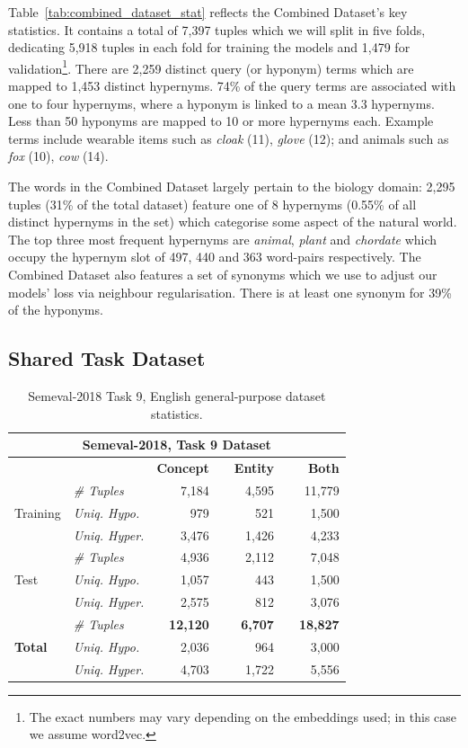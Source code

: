 Table~\ref{tab:combined_dataset_stat} reflects the Combined Dataset's key statistics.  It contains a total of 7,397 tuples which we will split in five folds, dedicating 5,918 tuples in each fold for training the models and 1,479 for validation\footnote{The exact numbers may vary depending on the embeddings used; in this case we assume word2vec.}.  There are 2,259 distinct query (or hyponym) terms which are mapped to 1,453 distinct hypernyms.  74\% of the query terms are associated with one to four hypernyms, where a hyponym is linked to a mean 3.3 hypernyms.  Less than 50 hyponyms are mapped to 10 or more hypernyms each.  Example terms include wearable items such as \textit{cloak} (11), \textit{glove} (12); and animals such as \textit{fox} (10), \textit{cow} (14).  

The words in the Combined Dataset largely pertain to the biology domain: 2,295 tuples (31\% of the total dataset) feature one of 8 hypernyms (0.55\% of all distinct hypernyms in the set) which categorise some aspect of the natural world.  The top three most frequent hypernyms are \textit{animal}, \textit{plant} and \textit{chordate} which occupy the hypernym slot of 497, 440 and 363 word-pairs respectively.  The Combined Dataset also features a set of synonyms which we use to adjust our models' loss via neighbour regularisation.  There is at least one synonym for 39\% of the hyponyms.

\subsection{Shared Task Dataset}
\begin{table}\centering
\begin{tabular}{@{}llrcrcr@{}}\toprule
\multicolumn{7}{c}{\textbf{Semeval-2018, Task 9 Dataset}} \\ \midrule
& & \textbf{Concept} & \phantom{a} & \textbf{Entity} & \phantom{a} & \textbf{Both} \\
\cmidrule{3-3} \cmidrule{5-5} \cmidrule{7-7}
\multirow{3}{*}{Training} & \textit{\# Tuples} & 7,184 && 4,595 && 11,779 \\
& \textit{Uniq. Hypo.} & 979 && 521 && 1,500\\
& \textit{Uniq. Hyper.} & 3,476 && 1,426 && 4,233\\ 
\cmidrule{2-7}
\multirow{3}{*}{Test} & \textit{\# Tuples} & 4,936 && 2,112 && 7,048 \\
& \textit{Uniq. Hypo.} & 1,057 && 443 && 1,500\\
& \textit{Uniq. Hyper.} & 2,575 && 812 && 3,076\\
\cmidrule{2-7}
\multirow{3}{*}{\textbf{Total}} & \textit{\# Tuples} & \textbf{12,120} && \textbf{6,707} && \textbf{18,827} \\
& \textit{Uniq. Hypo.} & 2,036 && 964 && 3,000\\
& \textit{Uniq. Hyper.} & 4,703 && 1,722 && 5,556\\
\bottomrule
\end{tabular}
\caption{Semeval-2018 Task 9, English general-purpose dataset statistics.}\label{tab:semeval_dataset_stat}
\end{table}

